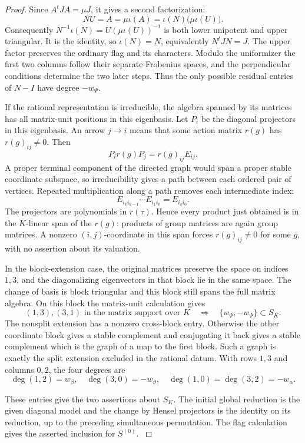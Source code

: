 \begin{proof}
Since \(A^t J A=\mu J\), it gives a second factorization:
\[
 NU=A=\mu\iota(A)=\iota(N)\bigl(\mu\iota(U)\bigr).
\]
Consequently \(N^{-1}\iota(N)=U(\mu\iota(U))^{-1}\) is both lower unipotent and upper triangular. It is the identity, so \(\iota(N)=N\), equivalently \(N^tJN=J\). The upper factor preserves the ordinary flag
and its characters. Modulo the uniformizer the first two
columns follow their separate Frobenius spaces, and the
perpendicular conditions determine the two later steps.
Thus the only possible residual entries of \(N-I\) have
degree \(-w_\Psi\).

If the rational representation is irreducible, the
algebra spanned by its matrices has all matrix-unit
positions in this eigenbasis. Let \(P_i\) be the diagonal projectors in this eigenbasis.
An arrow \(j\to i\) means that some action matrix \(r(g)\)
has \(r(g)_{ij}\ne0\). Then
\[
 P_i r(g)P_j=r(g)_{ij}E_{ij}.
\]
A proper terminal component of the directed graph would span
a proper stable coordinate subspace, so irreducibility gives
a path between each ordered pair of vertices. Repeated multiplication along a path removes each intermediate index:
\[
 E_{i_k i_{k-1}}\cdots E_{i_1 i_0}=E_{i_k i_0}.
\]
The projectors are polynomials in \(r(\tau)\). Hence every
product just obtained is in the \(K\)-linear span of the \(r(g)\):
products of group matrices are again group matrices. A nonzero
\((i,j)\)-coordinate in this span forces \(r(g)_{ij}\ne0\)
for some \(g\), with no assertion about its valuation.

In the block-extension case, the original matrices
preserve the space on indices \(1,3\), and the
diagonalizing eigenvectors in that block lie in the
same space. The change of basis is block triangular
and this block still spans the full matrix algebra.
On this block the matrix-unit calculation gives
\[
    (1,3),(3,1)\text{ in the matrix support over }K
       \quad\Longrightarrow\quad \{w_\Psi,-w_\Psi\}\subset S_K .
\]
 The nonsplit extension has a
nonzero cross-block entry. Otherwise the other
coordinate block gives a stable complement and
conjugating it back gives a stable complement
which is the graph of a map to the first block.
Such a graph is exactly the split extension
excluded in the rational datum. With rows \(1,3\) and columns \(0,2\), the four degrees are
\[
  \deg(1,2)=w_\beta,\quad \deg(3,0)=-w_\vartheta,\quad
  \deg(1,0)=\deg(3,2)=-w_\alpha .
\]

These entries give the two assertions about \(S_K\).
The initial global reduction is the given diagonal model and the
change by Hensel projectors is the identity on its reduction,
up to the preceding simultaneous permutation. The flag calculation
gives the asserted inclusion for \(S^{(0)}\).
\label{cor:cohomology-count-two-normalization-1}
\end{proof}


